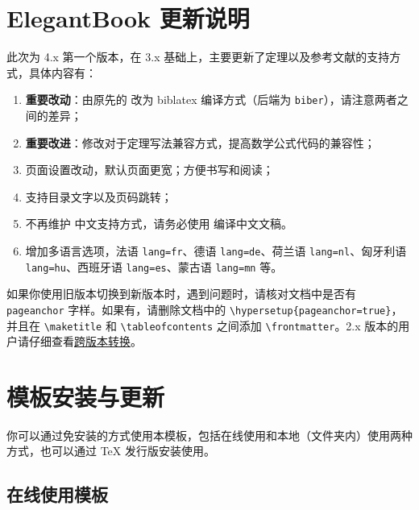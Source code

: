 \documentclass[cn,10pt,math=newtx,citestyle=gb7714-2015,bibstyle=gb7714-2015]{elegantbook}
\begin{document}
\section{ElegantBook 更新说明}

此次为 4.x 第一个版本，在 3.x 基础上，主要更新了定理以及参考文献的支持方式，具体内容有：

\begin{enumerate}
  \item \textbf{重要改动}：由原先的  改为 biblatex 编译方式（后端为 \lstinline{biber}），请注意两者之间的差异；
  \item \textbf{重要改进}：修改对于定理写法兼容方式，提高数学公式代码的兼容性；
  \item 页面设置改动，默认页面更宽；方便书写和阅读；
  \item 支持目录文字以及页码跳转；
  \item 不再维护  中文支持方式，请务必使用  编译中文文稿。
  \item 增加多语言选项，法语 \lstinline{lang=fr}、德语 \lstinline{lang=de}、荷兰语 \lstinline{lang=nl}、匈牙利语 \lstinline{lang=hu}、西班牙语 \lstinline{lang=es}、蒙古语 \lstinline{lang=mn} 等。
\end{enumerate}

\begin{note}
如果你使用旧版本切换到新版本时，遇到问题时，请核对文档中是否有 \lstinline{pageanchor} 字样。如果有，请删除文档中的 \lstinline|\hypersetup{pageanchor=true}|，并且在 \lstinline{\maketitle} 和 \lstinline{\tableofcontents} 之间添加 \lstinline{\frontmatter}。2.x 版本的用户请仔细查看\href{https://github.com/ElegantLaTeX/ElegantBook/wiki/convert}{跨版本转换}。
\end{note}

\section{模板安装与更新}

你可以通过免安装的方式使用本模板，包括在线使用和本地（文件夹内）使用两种方式，也可以通过 \TeX{} 发行版安装使用。

\subsection{在线使用模板}
\end{document}
